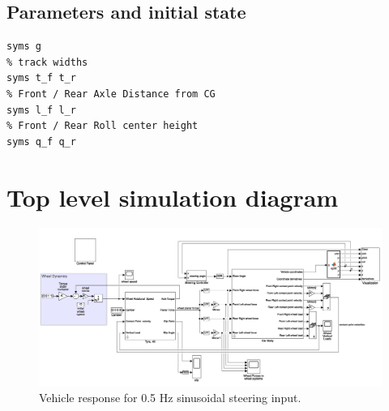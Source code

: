 \subsection{Parameters and initial state}

\begin{lstlisting}[caption={Parameters Declaration}]
% gravitational acceleration
syms g
% track widths
syms t_f t_r
% Front / Rear Axle Distance from CG
syms l_f l_r
% Front / Rear Roll center height
syms q_f q_r
\end{lstlisting}



\section{Top level simulation diagram}

\begin{figure}
  \centering
  \includegraphics[width=\textwidth]{images/6dofsimulink.png}
  \caption{Vehicle response for 0.5 Hz sinusoidal steering input.}
  \label{regression}
\end{figure}
